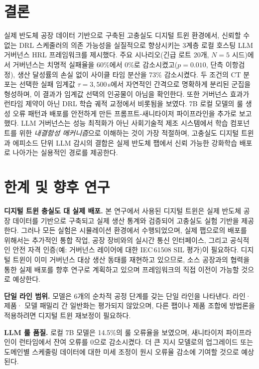 \documentclass[10pt]{article}
\begin{document}
\section{결론}
실제 반도체 공장 데이터 기반으로 구축된 고충실도 디지털 트윈 환경에서,
신뢰할 수 없는 DRL 스케줄러의 의존 가능성을 실질적으로 향상시키는
3계층 로컬 호스팅 LLM 거버넌스 HRL 프레임워크를 제시했다.
주요 시나리오(긴급 로트 20개, $N=5$ 시드)에서 거버넌스는 치명적 실패율을
60\%에서 0\%로 감소시켰고($p=0.010$, 단측 이항검정), 생산 달성률의 손실 없이
사이클 타임 분산을 73\% 감소시켰다.
두 조건의 CT 분포는 선택한 실패 임계값 $\tau=3{,}500$\,s에서 자연적인 간격으로
명확하게 분리된 군집을 형성하며, 이 결과가 임계값 선택의 인공물이 아님을 확인한다.
또한 거버넌스 효과가 런타임 제약이 아닌 DRL 학습 궤적 교정에서 비롯됨을 보였다.
7B 로컬 모델의 룰 생성 오류 패턴과 배포를 안전하게 만든 프롬프트-새니타이저
파이프라인을 추가로 보고했다. LLM 거버넌스는 성능 최적화가 아닌
사회기술적 제조 시스템에서 학습 컴포넌트를 위한 \emph{내결함성 메커니즘}으로
이해하는 것이 가장 적절하며, 고충실도 디지털 트윈과 에피소드 단위 LLM 감시의
결합은 실제 반도체 팹에서 신뢰 가능한 강화학습 배포로 나아가는 실용적인
경로를 제공한다.

\section{한계 및 향후 연구}
\label{sec:limitations}

\textbf{디지털 트윈 충실도 대 실제 배포.}
본 연구에서 사용된 디지털 트윈은 실제 반도체 공장 데이터를 기반으로 구축되고
실제 생산 통계와 검증되어 고충실도 실험 기반을 제공한다.
그러나 모든 실험은 시뮬레이션 환경에서 수행되었으며, 실제 팹으로의 배포를 위해서는
추가적인 통합 작업, 공장 장비와의 실시간 통신 인터페이스, 그리고 공식적인
안전 자격 인증(예: 거버넌스 레이어에 대한 IEC\,61508 SIL 평가)이 필요하다.
디지털 트윈이 이미 거버넌스 대상 생산 동태를 재현하고 있으므로, 소스 공장과의
협력을 통한 실제 배포를 향후 연구로 계획하고 있으며 프레임워크의 직접 이전이
가능할 것으로 예상한다.

\textbf{단일 라인 범위.}
모델은 6개의 순차적 공정 단계를 갖는 단일 라인을 나타낸다. 라인·제품·
모델 패밀리 간 일반화는 평가되지 않았으며, 다른 팹이나 제품 조합에 방법론을
적용하려면 디지털 트윈 재보정이 필요하다.

\textbf{LLM 룰 품질.}
로컬 7B 모델은 14.5\%의 룰 오류율을 보였으며, 새니타이저 파이프라인이
런타임에서 잔여 오류를 0으로 감소시켰다. 더 큰 지시 모델로의 업그레이드 또는
도메인별 스케줄링 데이터에 대한 미세 조정이 원시 오류율 감소에 기여할 것으로
예상된다.

\printbibliography
\end{document}
